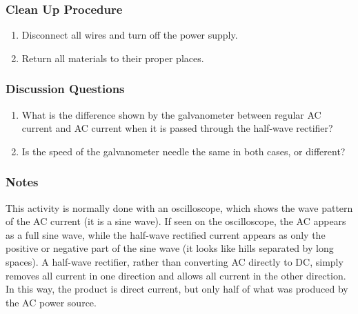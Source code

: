 \subsubsection*{Clean Up Procedure}
\begin{enumerate}
\item{Disconnect all wires and turn off the power supply.}
\item{Return all materials to their proper places.}
\end{enumerate}

\subsubsection*{Discussion Questions}
\begin{enumerate}
\item{What is the difference shown by the galvanometer between regular AC current and AC current when it is passed through the half-wave rectifier?}
\item{Is the speed of the galvanometer needle the same in both cases, or different?}
\end{enumerate}

\subsubsection*{Notes}
This activity is normally done with an oscilloscope, which shows the wave pattern of the AC current (it is a sine wave).  If seen on the oscilloscope, the AC appears as a full sine wave, while the half-wave rectified current appears as only the positive or negative part of the sine wave (it looks like hills separated by long spaces).
A half-wave rectifier, rather than converting AC directly to DC, simply removes all current in one direction and allows all current in the other direction.  In this way, the product is direct current, but only half of what was produced by the AC power source.
